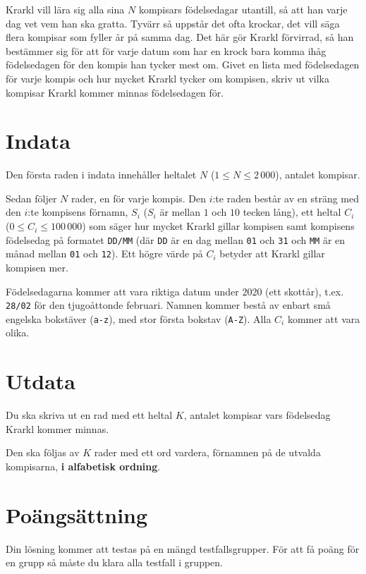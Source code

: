 \def\version{jury-3}
\noindent
Krarkl vill lära sig alla sina $N$ kompisars födelsedagar utantill, så att han varje dag vet vem han ska gratta.
Tyvärr så uppstår det ofta krockar, det vill säga flera kompisar som fyller år på samma dag.
Det här gör Krarkl förvirrad, så han bestämmer sig för att för varje datum som har en krock bara komma ihåg födelsedagen för den kompis han tycker mest om.
Givet en lista med födelsedagen för varje kompis och hur mycket Krarkl tycker om kompisen, skriv ut vilka kompisar Krarkl kommer minnas födelsedagen för.

\section*{Indata}
Den första raden i indata innehåller heltalet $N$ ($1 \leq N \leq 2\,000$), antalet kompisar.

Sedan följer $N$ rader, en för varje kompis.
Den $i$:te raden består av en sträng med den $i$:te kompisens förnamn, $S_i$ ($S_i$ är mellan $1$ och $10$ tecken lång), ett heltal $C_i$ ($0 \leq C_i \leq 100\,000$) som säger hur mycket Krarkl gillar kompisen samt kompisens födelsedag på formatet \texttt{DD/MM} (där \texttt{DD} är en dag mellan \texttt{01} och \texttt{31} och \texttt{MM} är en månad mellan \texttt{01} och \texttt{12}).
Ett högre värde på $C_i$ betyder att Krarkl gillar kompisen mer.

Födelsedagarna kommer att vara riktiga datum under 2020 (ett skottår), t.ex. \texttt{28/02} för den tjugoåttonde februari.
Namnen kommer bestå av enbart små engelska bokstäver (\texttt{a-z}), med stor första bokstav (\texttt{A-Z}).
Alla $C_i$ kommer att vara olika.

\section*{Utdata}
Du ska skriva ut en rad med ett heltal $K$, antalet kompisar vars födelsedag Krarkl kommer minnas.

Den ska följas av $K$ rader med ett ord vardera, förnamnen på de utvalda kompisarna, \textbf{i alfabetisk ordning}.

\section*{Poängsättning}
Din lösning kommer att testas på en mängd testfallsgrupper.
För att få poäng för en grupp så måste du klara alla testfall i gruppen.

